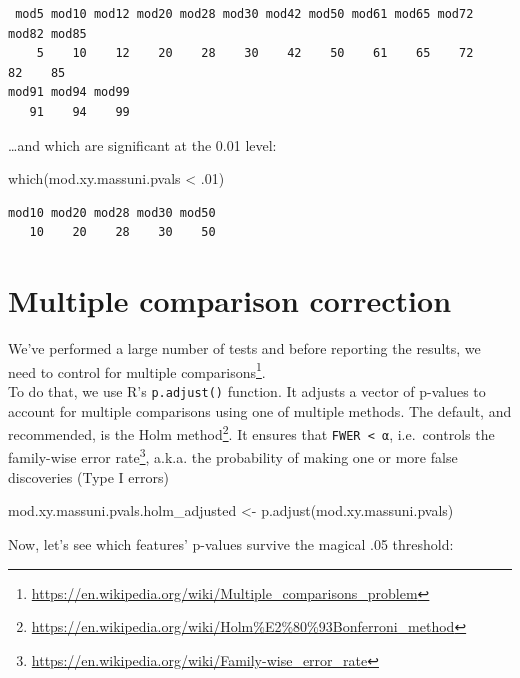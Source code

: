 \documentclass[
]{book}
\newenvironment{Shaded}{\begin{snugshade}}{\end{snugshade}}
\newcommand{\DecValTok}[1]{\textcolor[rgb]{0.00,0.00,0.81}{#1}}
\newcommand{\FunctionTok}[1]{\textcolor[rgb]{0.00,0.00,0.00}{#1}}
\newcommand{\NormalTok}[1]{#1}
\newcommand{\OtherTok}[1]{\textcolor[rgb]{0.56,0.35,0.01}{#1}}
\newcommand{\SpecialCharTok}[1]{\textcolor[rgb]{0.00,0.00,0.00}{#1}}
\renewcommand{\href}[2]{#2\footnote{\url{#1}}}
\begin{document}
\begin{verbatim}
 mod5 mod10 mod12 mod20 mod28 mod30 mod42 mod50 mod61 mod65 mod72 mod82 mod85 
    5    10    12    20    28    30    42    50    61    65    72    82    85 
mod91 mod94 mod99 
   91    94    99 
\end{verbatim}

\ldots and which are significant at the 0.01 level:

\begin{Shaded}
\begin{Highlighting}[]
\FunctionTok{which}\NormalTok{(mod.xy.massuni.pvals }\SpecialCharTok{\textless{}}\NormalTok{ .}\DecValTok{01}\NormalTok{)}
\end{Highlighting}
\end{Shaded}

\begin{verbatim}
mod10 mod20 mod28 mod30 mod50 
   10    20    28    30    50 
\end{verbatim}

\hypertarget{multiple-comparison-correction}{%
\section{Multiple comparison correction}\label{multiple-comparison-correction}}

We've performed a large number of tests and before reporting the results, we need to control for \href{https://en.wikipedia.org/wiki/Multiple_comparisons_problem}{multiple comparisons}.\\
To do that, we use R's \texttt{p.adjust()} function. It adjusts a vector of p-values to account for multiple comparisons using one of multiple methods. The default, and recommended, is the \href{https://en.wikipedia.org/wiki/Holm\%E2\%80\%93Bonferroni_method}{Holm method}. It ensures that \texttt{FWER\ \textless{}\ α}, i.e.~controls the \href{https://en.wikipedia.org/wiki/Family-wise_error_rate}{family-wise error rate}, a.k.a. the probability of making one or more false discoveries (Type I errors)

\begin{Shaded}
\begin{Highlighting}[]
\NormalTok{mod.xy.massuni.pvals.holm\_adjusted }\OtherTok{\textless{}{-}} \FunctionTok{p.adjust}\NormalTok{(mod.xy.massuni.pvals)}
\end{Highlighting}
\end{Shaded}

Now, let's see which features' p-values survive the magical .05 threshold:
\end{document}
